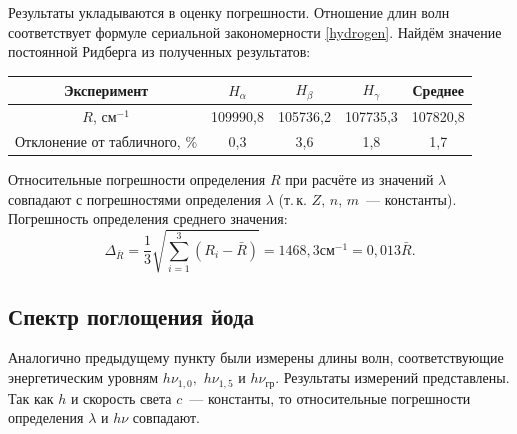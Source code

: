 Результаты укладываются в оценку погрешности. Отношение длин волн соответствует формуле сериальной закономерности \eqref{hydrogen}. Найдём значение постоянной Ридберга из полученных результатов:
\begin{table}[h]
    \centering
    \begin{tabular}{|c|c|c|c|c|} \hline
        Эксперимент & $H_\alpha$ & $H_\beta$ & $H_\gamma$ & Среднее \\ \hline
        $R$, см$^{-1}$ & 109990,8 & 105736,2 & 107735,3 & 107820,8 \\ \hline
        Отклонение от табличного, \% & 0,3 & 3,6 & 1,8 & 1,7 \\ \hline
    \end{tabular}
\end{table}
Относительные погрешности определения $R$ при расчёте из значений $\lambda$ совпадают с погрешностями определения $\lambda$ (т.\,к. $Z,\,n,\,m$~--- константы). Погрешность определения среднего значения:
\begin{equation}
\Delta_{\bar{R}} = \frac{1}{3}\sqrt{\sum\limits_{i=1}^3(R_i - \bar{R})} = 1468,3 \text{см}^{-1} = 0,013\bar{R}.
\end{equation}

\subsection{Спектр поглощения йода}
Аналогично предыдущему пункту были измерены длины волн, соответствующие энергетическим уровням $h\nu_{1,0},$ $h\nu_{1,5}$ и $h\nu_\text{гр}$. Результаты измерений представлены.
Так как $h$ и скорость света $c$~--- константы, то относительные погрешности определения $\lambda$ и $h\nu$ совпадают.

